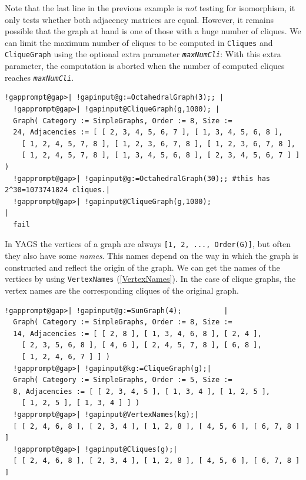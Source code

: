 \documentclass[a4paper,11pt]{report}
\begin{document}
{{Note that the last line in the previous example is \emph{not} testing for isomorphism, it only tests whether both adjacency matrices are
equal. However, it remains possible that the graph at hand is one of those
with a huge number of cliques. We can limit the maximum number of cliques to
be computed in \texttt{Cliques} and \texttt{CliqueGraph} using the optional extra parameter \mbox{\texttt{\mdseries\slshape maxNumCli}}: With this extra parameter, the computation is aborted when the number of
computed cliques reaches \mbox{\texttt{\mdseries\slshape maxNumCli}}. 

 
\begin{Verbatim}[commandchars=!@|,fontsize=\small,frame=single,label=Example]
  !gapprompt@gap>| !gapinput@g:=OctahedralGraph(3);; |
  !gapprompt@gap>| !gapinput@CliqueGraph(g,1000); |
  Graph( Category := SimpleGraphs, Order := 8, Size := 
  24, Adjacencies := [ [ 2, 3, 4, 5, 6, 7 ], [ 1, 3, 4, 5, 6, 8 ], 
    [ 1, 2, 4, 5, 7, 8 ], [ 1, 2, 3, 6, 7, 8 ], [ 1, 2, 3, 6, 7, 8 ], 
    [ 1, 2, 4, 5, 7, 8 ], [ 1, 3, 4, 5, 6, 8 ], [ 2, 3, 4, 5, 6, 7 ] ] )
  !gapprompt@gap>| !gapinput@g:=OctahedralGraph(30);; #this has 2^30=1073741824 cliques.|
  !gapprompt@gap>| !gapinput@CliqueGraph(g,1000);                            |
  fail
\end{Verbatim}
 

In \textsf{YAGS} the vertices of a graph are always \texttt{[1, 2, ..., Order(G)]}, but often they also have some \emph{names}. This names depend on the way in which the graph is constructed and reflect
the origin of the graph. We can get the names of the vertices by using \texttt{VertexNames} (\ref{VertexNames}). In the case of clique graphs, the vertex names are the corresponding cliques
of the original graph. 

 
\begin{Verbatim}[commandchars=!@|,fontsize=\small,frame=single,label=Example]
  !gapprompt@gap>| !gapinput@g:=SunGraph(4);          |
  Graph( Category := SimpleGraphs, Order := 8, Size := 
  14, Adjacencies := [ [ 2, 8 ], [ 1, 3, 4, 6, 8 ], [ 2, 4 ], 
    [ 2, 3, 5, 6, 8 ], [ 4, 6 ], [ 2, 4, 5, 7, 8 ], [ 6, 8 ], 
    [ 1, 2, 4, 6, 7 ] ] )
  !gapprompt@gap>| !gapinput@kg:=CliqueGraph(g);|
  Graph( Category := SimpleGraphs, Order := 5, Size := 
  8, Adjacencies := [ [ 2, 3, 4, 5 ], [ 1, 3, 4 ], [ 1, 2, 5 ], 
    [ 1, 2, 5 ], [ 1, 3, 4 ] ] )
  !gapprompt@gap>| !gapinput@VertexNames(kg);|
  [ [ 2, 4, 6, 8 ], [ 2, 3, 4 ], [ 1, 2, 8 ], [ 4, 5, 6 ], [ 6, 7, 8 ] ]
  !gapprompt@gap>| !gapinput@Cliques(g);|
  [ [ 2, 4, 6, 8 ], [ 2, 3, 4 ], [ 1, 2, 8 ], [ 4, 5, 6 ], [ 6, 7, 8 ] ]
\end{Verbatim}
 

}}
\end{document}
